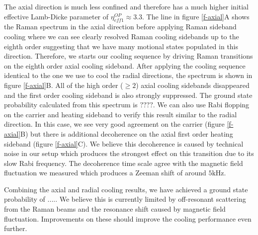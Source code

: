 \documentclass[aps,prl,twocolumn,groupedaddress]{revtex4-1}
\begin{document}
The axial direction is much less confined and therefore has a much higher initial effective
Lamb-Dicke parameter of $\eta^{OP}_{eff1}\approx3.3$.
The line in figure \ref{f-axial}A shows the Raman spectrum in the axial direction
before applying Raman sideband cooling where we can see clearly resolved Raman cooling sidebands
up to the eighth order suggesting that we have many motional states populated in this direction.
Therefore, we starts our cooling sequence by driving Raman transitions on the eighth order axial
cooling sideband. After applying the cooling sequence identical to the one we use to cool
the radial directions, the spectrum is shown in figure \ref{f-axial}B.
All of the high order ($\geqslant2$) axial cooling sidebands disappeared and the first order
cooling sideband is also strongly suppressed.
The ground state probability calculated from this spectrum is $????$.
We can also use Rabi flopping on the carrier and heating sideband to verify this result
similar to the radial direction. In this case, we see very good agreement on the carrier
(figure \ref{f-axial}B) but there is additional decoherence on the axial first order
heating sideband (figure \ref{f-axial}C).
We believe this decoherence is caused by technical noise in our setup which
produces the strongest effect on this transition due to its slow Rabi frequency.
The decoherence time scale agree with the magnetic field fluctuation we measured which produces
a Zeeman shift of around $5\text{kHz}$.

Combining the axial and radial cooling results, we have achieved a ground state probability of
$....$. We believe this is currently limited by off-resonant scattering from the Raman beams
and the resonance shift caused by magnetic field fluctuation.
Improvements on these should improve the cooling performance even further.



\end{document}
